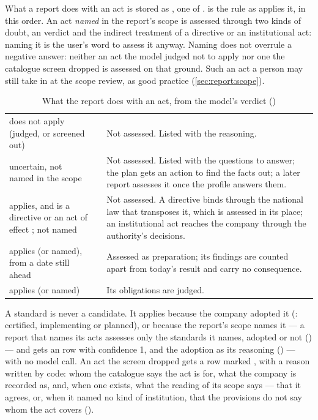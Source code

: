 What a report does with an act is stored as , one of
.  is the rule as  applies it,
in this order. An act \emph{named} in the report's scope is assessed through two kinds of
doubt, an  verdict and the indirect treatment of a directive or an
institutional act: naming it is the user's word to assess it anyway. Naming does not overrule
a negative answer: neither an act the model judged not to
apply nor one the catalogue screen dropped is assessed on that ground. Such an act a person may
still take in at the scope review, as good practice (\cref{sec:report:scope}).

\begin{table}[H]
\caption{What the report does with an act, from the model's verdict
()}\label{tab:report:assessment}
\begin{tabularx}{\textwidth}{@{}L{58mm}L{24mm}Y@{}}
\toprule
{} &  &  \\
\midrule
does not apply (judged, or screened out) &  & Not assessed. Listed with the reasoning. \\
uncertain, not named in the scope &  & Not assessed. Listed with the questions to answer; the plan gets an action to find the facts out; a later report assesses it once the profile answers them. \\
applies, and is a directive or an act of effect ; not named &  & Not assessed. A directive binds through the national law that transposes it, which is assessed in its place; an institutional act reaches the company through the authority's decisions. \\
applies (or named), from a date still ahead &  & Assessed as preparation; its findings are counted apart from today's result and carry no consequence. \\
applies (or named) &  & Its obligations are judged. \\
\bottomrule
\end{tabularx}
\end{table}

A standard is never a candidate. It applies because the company adopted it
(: certified, implementing or planned), or because the report's scope
names it --- a report that names its acts assesses only the standards it names, adopted or
not () --- and gets an  row with confidence 1,   and
the adoption as its reasoning () --- with no model call. An act the
screen dropped gets a  row marked , with a reason written
by code: whom the catalogue says the act is for, what the company is recorded as, and, when
one exists, what the reading of its scope says --- that it agrees, or, when it named no kind
of institution, that the provisions do not say whom the act covers
().

